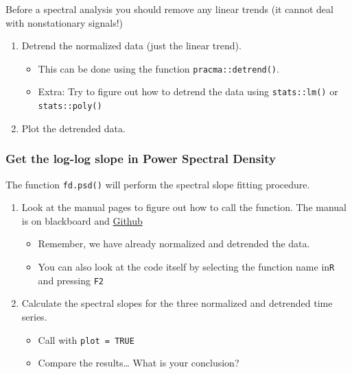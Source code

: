 \documentclass[]{book}
\providecommand{\tightlist}{%
  \setlength{\itemsep}{0pt}\setlength{\parskip}{0pt}}
\begin{document}
Before a spectral analysis you should remove any linear trends (it
cannot deal with nonstationary signals!)

\begin{enumerate}
\def\labelenumi{\arabic{enumi}.}
\tightlist
\item
  Detrend the normalized data (just the linear trend).

  \begin{itemize}
  \tightlist
  \item
    This can be done using the function \texttt{pracma::detrend()}.
  \item
    Extra: Try to figure out how to detrend the data using
    \texttt{stats::lm()} or \texttt{stats::poly()}
  \end{itemize}
\item
  Plot the detrended data.
\end{enumerate}

\subsubsection*{Get the log-log slope in Power Spectral
Density}\label{get-the-log-log-slope-in-power-spectral-density}

The function \texttt{fd.psd()} will perform the spectral slope fitting
procedure.

\begin{enumerate}
\def\labelenumi{\arabic{enumi}.}
\tightlist
\item
  Look at the manual pages to figure out how to call the function. The
  manual is on blackboard and
  \href{https://github.com/FredHasselman/DCS/blob/master/functionLib/}{Github}

  \begin{itemize}
  \tightlist
  \item
    Remember, we have already normalized and detrended the data.
  \item
    You can also look at the code itself by selecting the function name
    in\texttt{R} and pressing \texttt{F2}
  \end{itemize}
\item
  Calculate the spectral slopes for the three normalized and detrended
  time series.

  \begin{itemize}
  \tightlist
  \item
    Call with \texttt{plot\ =\ TRUE}
  \item
    Compare the results\ldots{} What is your conclusion?
  \end{itemize}
\end{enumerate}
\end{document}
